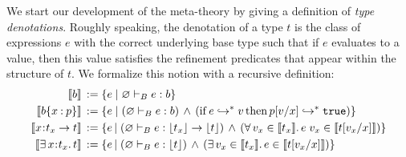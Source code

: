 \documentclass[11pt]{article}
\newcommand{\bind}{\hspace{0.05em}{:}\hspace{0.05em}} %
\newcommand{\col}{\mathbin{:}}       %
\newcommand{\lb}{\llbracket}         %
\newcommand{\rb}{\rrbracket}         %
\newcommand{\many}{\hookrightarrow^*}
\begin{document}
We start our development of the meta-theory by giving a definition of {\em type denotations}. Roughly speaking, the denotation of a type $t$ is the class of expressions $e$ with the correct underlying base type such that if $e$ evaluates to a value, then this value satisfies the refinement predicates that appear within the structure of $t$. We formalize this notion with a recursive definition:
\begin{align*}
\lb b \rb \,&:= \{ e \;|\; \varnothing \vdash_B e : b\}\\
\lb b\{x\col p\}\rb \,&:= 
  \{ e \;|\; (\varnothing \vdash_B e:b)
\,\wedge\, ({\rm if}\, e \many v \,{\rm then}\, p[v/x] \many {\tt true})\} \\
\lb x\bind t_x \rightarrow t\rb \,&:= 
\{ e \,|\; (\varnothing \vdash_B e : \lfloor t_x\rfloor \rightarrow \lfloor t\rfloor ) \,\wedge\,
( \forall\, v_x \in \lb t_x \rb.\, e\; v_x \in \lb t[v_x/x] \rb)\} \\
\lb \exists\, x\bind t_x .\, t\rb \,&:= 
\{ e \,|\; (\varnothing \vdash_B e : \lfloor t\rfloor ) \,\wedge\,
( \exists\, v_x \in \lb t_x \rb.\, e \in \lb t[v_x/x] \rb)\}
\end{align*}
\end{document}
